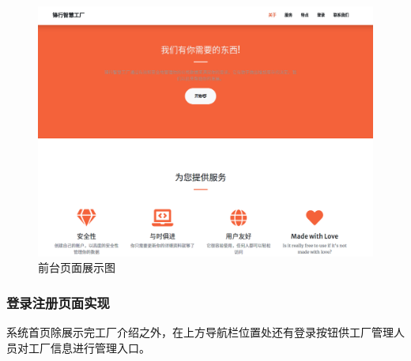 \begin{figure}[H]
        \centering
        \includegraphics[width=.75\textwidth]{figures/5index2.png}
    \caption{前台页面展示图}
    \label{fig:index}
\end{figure}

\subsubsection{登录注册页面实现}

系统首页除展示完工厂介绍之外，在上方导航栏位置处还有登录按钮供工厂管理人员对工厂信息进行管理入口。

